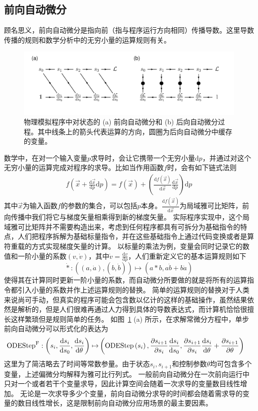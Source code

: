 \documentclass[A4,twoside,UTF8]{ctexart}
\def\D{\mathrm{d}}
\begin{document}
\subsection{前向自动微分}
    顾名思义，前向自动微分是指向前（指与程序运行方向相同）传播导数。这里导数传播的规则和数学分析中的无穷小量的运算规则有关。
    \begin{figure}[t]
        \centering
        \includegraphics[width=0.9\columnwidth,trim={0 0cm 0 0},clip]{fig3.pdf}
        \caption{物理模拟程序中对状态的 (a) 前向自动微分和 (b) 后向自动微分过程。其中线条上的箭头代表运算的方向，圆圈为后向自动微分中缓存的变量。}\label{fig:autodifftypes}
\end{figure}
数学中，在对一个输入变量$p$求导时，会让它携带一个无穷小量$\D p$，并通过对这个无穷小量的运算完成对程序的求导。比如当作用函数$f$时，会有如下链式法则
\begin{align}
    f\left(\vec x+ \frac{\D \vec x}{\D p} \D p\right) = f(\vec x) + \left(\frac{\D f(\vec x)}{\D \vec x}\frac{\D \vec x}{\D p}\right) \D p
\end{align}
其中$\vec x$为输入函数$f$的参数的集合，可以包括$p$本身。$\frac{\D f(\vec x)}{\D \vec x}$为局域雅可比矩阵，前向传播中我们将它与梯度矢量相乘得到新的梯度矢量。
实际程序实现中，这个局域雅可比矩阵并不需要构造出来，考虑到任何程序都具有可拆分为基础指令的特点，人们把程序拆解为基础标量指令，并在这些基础指令上通过代码变换或者是算符重载的方式实现梯度矢量的计算。
以标量的乘法为例，变量会同时记录它的数值和一阶小量的系数$(v, \dot v)$，其中$\dot v = \frac{\D v}{\D p}$，人们重新定义它的基本运算规则如下
$$\dot{*}: ((a, \dot a), (b, \dot b)) \mapsto (a * b, a \dot b + b \dot a)$$
使得其在计算同时更新一阶小量的系数，而自动微分所要做的就是将所有的运算指令都引入小量的系数并作上述运算规则的替换。
简单的运算规则的替换对于人类来说尚可手动，但真实的程序可能会包含数以亿计的这样的基础操作，虽然结果依然是解析的，但是人们很难再通过人力得到具体的导数表达式，而计算机恰恰很擅长这样繁琐但是规则简单的任务。
如图~\ref{fig:autodifftypes} (a) 所示，在求解常微分方程中，单步前向自动微分可以形式化的表达为
\begin{align*}
    {\rm ODEStep}^{\rm F} : \left(s_{i}, \frac{\D s_{i}}{\D s_0}, \frac{\D s_{i}}{\D \theta}\right)
        \mapsto &\left({\rm ODEStep}\left(s_{i}\right), \frac{\partial s_{i+1}}{\partial s_i} \frac{\D s_{i}}{\D s_0},
        \frac{\partial s_{i+1}}{\partial s_i} \frac{\D s_{i}}{\D \theta} + \frac{\partial s_{i+1}}{\partial \theta}\right)
\end{align*}
这里为了简洁略去了时间等常数参量。由于状态$s_i, s_{i+1}$和控制参数$\theta$均可包含多个变量，上述偏微分均解释为雅可比行列式。
一般前向自动微分在一次前向运行中只对一个或者若干个变量求导，因此计算空间会随着一次求导的变量数目线性增加。
无论是一次求导多少个变量，前向自动微分求导的时间都会随着需求导的变量的数目线性增长，这是限制前向自动微分应用场景的最主要因素。
\end{document}
